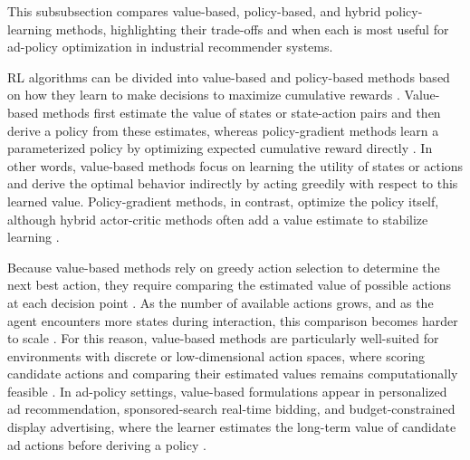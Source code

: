 \documentclass[manuscript,review,screen]{acmart}
\begin{document}
This subsubsection compares value-based, policy-based, and hybrid policy-learning methods, highlighting their trade-offs and when each is most useful for ad-policy optimization in industrial recommender systems.

RL algorithms can be divided into value-based and policy-based methods based on how they learn to make decisions to maximize cumulative rewards \cite{Sutton1998}. Value-based methods first estimate the value of states or state-action pairs and then derive a policy from these estimates, whereas policy-gradient methods learn a parameterized policy by optimizing expected cumulative reward directly \cite{williams1992simple}. In other words, value-based methods focus on learning the utility of states or actions and derive the optimal behavior indirectly by acting greedily with respect to this learned value. Policy-gradient methods, in contrast, optimize the policy itself, although hybrid actor-critic methods often add a value estimate to stabilize learning \cite{mnih2016asynchronous, chen2022off}.

Because value-based methods rely on greedy action selection to determine the next best action, they require comparing the estimated value of possible actions at each decision point \cite{Sutton1998, zhu2021overview}. As the number of available actions grows, and as the agent encounters more states during interaction, this comparison becomes harder to scale \cite{dulac2021challenges}. For this reason, value-based methods are particularly well-suited for environments with discrete or low-dimensional action spaces, where scoring candidate actions and comparing their estimated values remains computationally feasible \cite{zhu2021overview}. In ad-policy settings, value-based formulations appear in personalized ad recommendation, sponsored-search real-time bidding, and budget-constrained display advertising, where the learner estimates the long-term value of candidate ad actions before deriving a policy \cite{Theocharous-2015, zhao2018deep, wu2018budget}.
\end{document}
